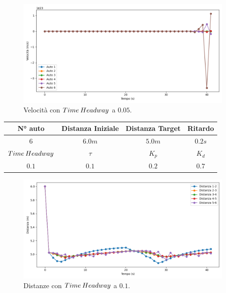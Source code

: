 \begin{figure}[H]
    \includegraphics[width=0.96\textwidth]{images/5-experiment/time-headway/velocity_0,05.png}
    \caption{Velocità con $Time\hspace{0.2em}Headway$ a $0.05$.}
    \label{fig:0.05-headway-velocity}
\end{figure}
\vspace*{\fill}
\newpage
\vspace*{\fill}
\begin{table}[h]
    \centering
    \begin{tabular}{|c|c|c|c|}
        \hline
        N° auto & Distanza Iniziale & Distanza Target & Ritardo \\
        \hline
        $6$ & $6.0 m$ & $5.0 m$ & $0.2 s$ \\
        \hline
        $Time\hspace{0.2em}Headway$ & $\tau$ & $K_p$ & $K_d$  \\
        \hline
        $0.1$ & $0.1$ & $0.2$ & $0.7$ \\
        \hline
    \end{tabular}
\end{table}

\begin{figure}[H]
    \includegraphics[width=0.96\textwidth]{images/5-experiment/time-headway/distance_0,1.png}
    \caption{Distanze con $Time\hspace{0.2em}Headway$ a $0.1$.}
    \label{fig:0.1-headway-distance}
\end{figure}

